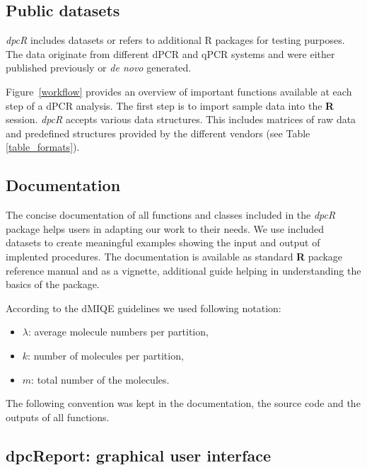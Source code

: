 \documentclass[a4,center,fleqn]{NAR}
\begin{document}
\subsection{Public datasets}

\textit{dpcR} includes datasets or refers to additional R packages for testing 
purposes. The data originate from different dPCR and qPCR systems and were 
either published previously \cite{whale_comparison_2012, roediger2015chippcr, 
white_digital_2009, rodiger_r_2015, dorazio_statistical_2015} or \textit{de 
novo} generated.

Figure~\ref{workflow} provides an overview of important functions available at 
each step of a dPCR analysis. The first step is to import sample data into the 
\textbf{R} session. \textit{dpcR} accepts various data structures. This 
includes 
matrices of raw data and predefined structures provided by the different 
vendors 
(see Table \ref{table_formats}). 


\subsection{Documentation}

The concise documentation of all functions and classes included in the 
\textit{dpcR} package helps users in adapting our work to their needs. We use 
included datasets to create meaningful examples showing the input and output of 
implented procedures. The documentation is available as standard \textbf{R} 
package reference manual and as a vignette, additional guide helping in 
understanding the basics of the package.

According to the dMIQE guidelines \cite{huggett_digital_2013} we used following 
notation:
\begin{itemize}
 \item $\lambda$: average molecule numbers per partition,
 \item $k$: number of molecules per partition,
 \item $m$: total number of the molecules.
\end{itemize}

The following convention was kept in the documentation, the source code and the 
outputs of all functions.


\subsection{dpcReport: graphical user interface}
\end{document}
